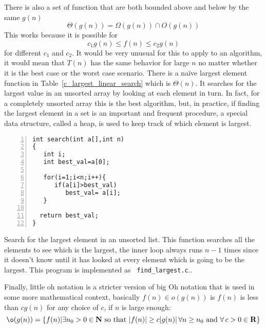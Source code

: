 \documentclass[11pt,a4paper]{scrartcl}
\begin{document}
There is also a set of function that are both bounded above and below
by the same $g(n)$
\begin{equation}
\Theta(g(n))=\Omega(g(n))\cap O(g(n))
\end{equation}
This works because it is possible for
\begin{equation}
c_1 g(n)\le f(n)\le c_2g(n)
\end{equation}
for different $c_1$ and $c_2$. It would be very unusual for this to
apply to an algorithm, it would mean that $T(n)$ has the same behavior
for large $n$ no matter whether it is the best case or the worst case
scenario. There is a na\"ive largest element function in
Table~\ref{c_largest_linear_search} which is $\Theta(n)$. It searches
for the largest value in an unsorted array by looking at each element
in turn. In fact, for a completely unsorted array this is the best
algorithm, but, in practice, if finding the largest element in a set
is an important and frequent procedure, a special data structure,
called a heap, is used to keep track of which element is largest.

\begin{table}
\begin{lstlisting}[numbers=left]
int search(int a[],int n)
{
   int i;
   int best_val=a[0];

   for(i=1;i<n;i++){
      if(a[i]>best_val)
         best_val= a[i];
   }

  return best_val;
}
\end{lstlisting}
\caption{Search for the largest element in an unsorted list. This
  function searches all the elements to see which is the largest, the
  inner loop always runs $n-1$ times since it doesn't know until it
  has looked at every element which is going to be the largest. This
  program is implemented as {\tt
    find\_largest.c}.\label{c_largest_linear_search}.}
\end{table}

Finally, little oh notation is a stricter version of big Oh notation
that is used in some more mathematical context, basically $f(n)\in
o(g(n))$ is $f(n)$ is less than $cg(n)$ for any choice of $c$, if $n$
is large enough:
\begin{equation}
\o(g(n))=\{f(n)| \exists n_0>0\in {\bf N}\mbox{ so that }|f(n)|\ge
c|g(n)|\,\forall n\ge n_0 \mbox{ and }\forall\,c>0\in {\bf R}\}
\end{equation}
\end{document}
